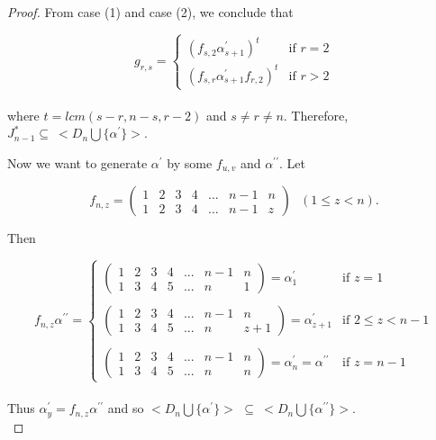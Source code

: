 \documentclass[10pt,a4paper]{amsart}
\begin{document}
\begin{proof}
\vspace{0.5cm}
From case (1) and case (2), we conclude that 

\begin{equation*}
    g_{r,s}= \begin{cases}
     (f_{s,2}\alpha^{\prime}_{s+1})^{t} & \text{if } r=2\\
    (f_{s,r}\alpha^{\prime}_{s+1}f_{r,2})^{t} & \text{if } r>2
    \end{cases}
\end{equation*}\\[10pt]
where $t=lcm(s-r,n-s,r-2)$ and $s \neq r \neq n$. Therefore, $J^*_{n-1}\subseteq \ <D_n \bigcup \{\alpha^\prime\}>$.

\vspace{0.9cm}
Now we want to generate $\alpha^\prime$ by some $f_{u,v}$ and $\alpha^{\prime\prime}$. Let

\vspace{0.5cm}
$$f_{n,z}=
\begin{pmatrix}  
1&2&3&4&...&n-1&n\\1&2&3&4&...&n-1&z
\end{pmatrix} \ \ \ (1\leq z <n).$$

Then

\vspace{0.5cm}
\begin{equation*}
f_{n,z}\alpha^{\prime\prime}=
    \begin{cases}
    \begin{pmatrix}  
1&2&3&4&...&n-1&n\\1&3&4&5&...&n&1
\end{pmatrix}=\alpha^{\prime}_1 & \text{if } z=1\\
\\
    \begin{pmatrix}  
1&2&3&4&...&n-1&n\\1&3&4&5&...&n&z+1
\end{pmatrix}=\alpha^{\prime}_{z+1}  & \text{if } 2\leq z <n-1\\
\\
    \begin{pmatrix}  
1&2&3&4&...&n-1&n\\1&3&4&5&...&n&n
\end{pmatrix}=\alpha^{\prime}_n=\alpha^{\prime\prime}  & \text{if } z=n-1
    \end{cases}
\end{equation*}\\[10pt]
Thus $\alpha^{\prime}_y=f_{n,z}\alpha^{\prime\prime}$ and so $<D_n \bigcup \{\alpha^{\prime}\}>$ $\subseteq \ <D_n \bigcup \{\alpha^{\prime\prime}\}>$.\\
\end{proof}
\end{document}
